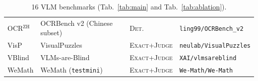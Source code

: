 \begin{table}[!htbp]
{\begin{tabular}{llll}
        OCR$^\text{ZH}$       & OCRBench v2 (Chinese subset)~\citep{fu2024ocrbench}                  & \textsc{Det.} & \texttt{ling99/OCRBench\_v2} \\
        VisP                  & VisualPuzzles~\citep{song2025visualpuzzles}                                 & \textsc{Exact+Judge} & \texttt{neulab/VisualPuzzles} \\
        VBlind                & VLMs-are-Blind~\citep{rahmanzadehgervi2024vision}                                & \textsc{Exact+Judge} & \texttt{XAI/vlmsareblind} \\
        WeMath                & WeMath (\texttt{testmini})~\citep{qiao2024we}                   & \textsc{Exact+Judge} & \texttt{We-Math/We-Math} \\
        \bottomrule
    \end{tabular}}
    \caption{16 VLM benchmarks (Tab.~\ref{tab:main} and Tab.~\ref{tab:ablation}).}
    \label{tab:appendix:vlm_benchmarks}
\end{table}

